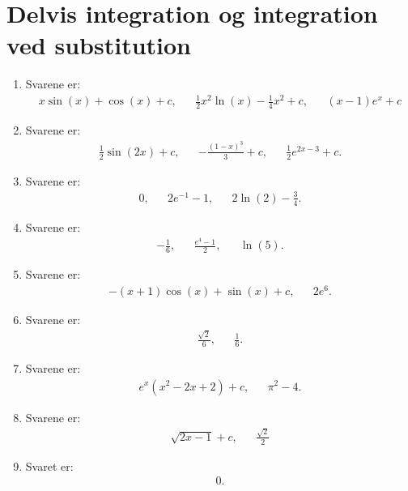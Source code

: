\section{Delvis integration og integration ved substitution}

\begin{enumerate}
	\item \label{it:int21ans} Svarene er:
	\begin{align*}
	x\sin(x)+\cos(x)+c,&& \frac{1}{2}x^2\ln(x)-\frac{1}{4}x^2+c,&& (x-1)e^x+c
	\end{align*}
	
	\item Svarene er:
	\begin{align*}
	\frac{1}{2}\sin(2x)+c,&& -\frac{(1-x)^3}{3}+c,&& \frac{1}{2} e^{2x-3}+c.
	\end{align*}
	
	\item Svarene er:
	\begin{align*}
	0,&& 2e^{-1}-1,&& 2\ln(2)-\frac{3}{4}.
	\end{align*}
	
	\item Svarene er:
	\begin{align*}
	-\frac{1}{6},&& \frac{e^4-1}{2},&& \ln(5).
	\end{align*}
	
	\item Svarene er:
	\begin{align*}
	-(x+1)\cos(x)+\sin(x)+c,&& 2e^{6}.
	\end{align*}
	
	\item Svarene er:
	\begin{align*}
	\frac{\sqrt{2}}{6},&& \frac{1}{6}.
	\end{align*}
	
	\item Svarene er:
	\begin{align*}
	e^x(x^2-2x+2) +c,&& \pi^2-4.
	\end{align*}
	
	\item Svarene er:
	\begin{align*}
	\sqrt{2x-1}+c,&& \frac{\sqrt{2}}{2}
	\end{align*}
	
	\item Svaret er:
	\begin{align*}
	0.
	\end{align*}
\end{enumerate}
